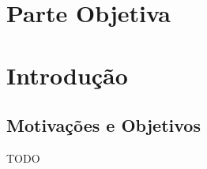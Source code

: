 \chapter*{Parte Objetiva}
\label{sec:parte_objetiva}
\chapter{Introdução}
\label{sec:intr}

\section{Motivações e Objetivos}
\label{sec:intr:motivacoes_objetivos}

TODO




